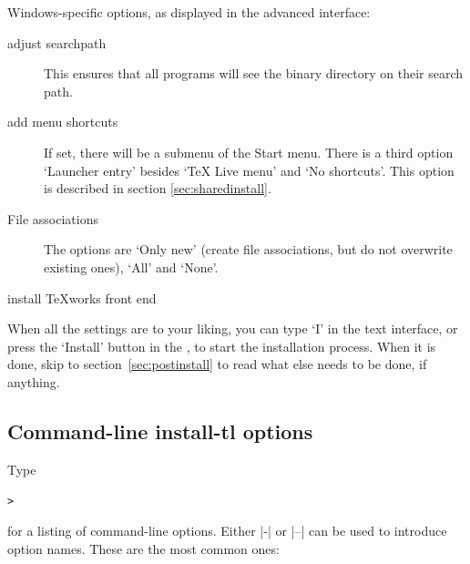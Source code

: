 \documentclass[12pt]{article}
\begin{document}
Windows-specific options, as displayed in the advanced \GUI{}
interface:
\begin{description}
\item[adjust searchpath] This ensures that all
  programs will see the \TL{} binary directory on their search path.

\item[add menu shortcuts] If set, there will be a \TL{} submenu of
  the Start menu. There is a third option `Launcher entry' besides
  `TeX Live menu' and `No shortcuts'. This option is described in
  section \ref{sec:sharedinstall}.

\item[File associations] The options are `Only new' (create
  file associations, but do not overwrite existing ones), `All' and
  `None'.

\item[install \TeX{}works front end]
\end{description}
When all the settings are to your liking, you can type `I' in the
text interface, or press the `Install' button in the
\GUI, to start the installation process. When it is done,
skip to section~\ref{sec:postinstall} to read what else needs to be
done, if anything.

\subsection{Command-line install-tl options}
\label{sec:cmdline}

Type
\begin{alltt}
> 
\end{alltt}
for a listing of command-line options.  Either |-| or |--| can be used
to introduce option names.  These are the most common ones:
\end{document}
